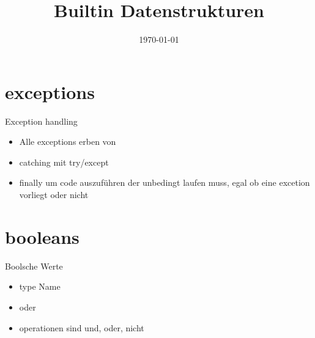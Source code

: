 \usepackage[utf8]{inputenc}

\newcommand{\topic}{
	Builtin Datenstrukturen
}

\title{\topic}
\supertitle{\course}
\date{\today}



\maketitle

\begin{frame}
	\tableofcontents
\end{frame}

\section{exceptions}
\begin{frame}{Exception handling}
\begin{itemize}
	\item Alle exceptions erben von 
	\item catching mit try/except
	\item finally um code auszuführen der unbedingt laufen muss, egal ob eine excetion vorliegt oder nicht
\end{itemize}
\end{frame}
\begin{frame}{}

\end{frame}

\section{booleans}
\begin{frame}{Boolsche Werte}
\begin{itemize}
	\item type Name 
	\item {} oder 
	\item operationen sind und, oder, nicht 
\end{itemize}
\end{frame}

